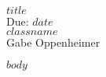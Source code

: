 \documentclass[
	twoside=false, %
	secnumdepth=2, %
	numbers=auto, %
]{kaohandt}
\title{\ptitle}
\author{Gabe Oppenheimer}
\date{\pdate}
\newcommand{\pdate}{$date$}
\newcommand{\pdate}{\today}
\newcommand{\passig}{$assignment$}
\newcommand{\passig}{hmm}
\newcommand{\ptitle}{$title$}
\newcommand{\ptitle}{Assignment \passig}
\newcommand{\pclass}{$classname$}
\newcommand{\pclass}{Your Class}
\newcommand{\hmwkAuthorName}{Gabe Oppenheimer}
\newcommand{\0}{\rlap{\textsuperscript{$${\circ}$$}}\xspace\xspace}
\newcommand{\1}{\rlap{$$'$$}\xspace}
\renewcommand{\'}[1]{$$\overline{\text{#1}}$$}
\begin{document}
\begin{fullwidth}
{\selectfont
	\noindent\textbf{\Huge{\ptitle}}\\[-.5em]
	
	\Large{Due: \pdate}\\[-.25em]
	\indent\Large{\textsc{\pclass}}\\[-.5em]
	
	\noindent\LARGE{\hmwkAuthorName}
}
\end{fullwidth}
\margintoc


\medskip


$body$



\end{document}
